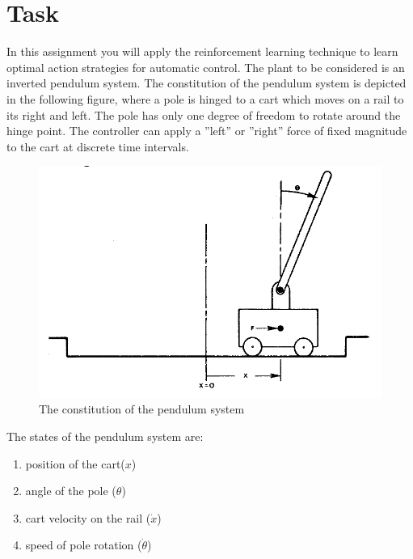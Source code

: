 \documentclass[12pt,a4paper]{article}
\begin{document}
\thispagestyle{empty}

\tableofcontents


\newpage


\setcounter{page}{3}


\section{Task}

In this assignment you will apply the reinforcement learning technique to learn optimal
action strategies for automatic control. The plant to be considered is an inverted pendulum
system. The constitution of the pendulum system is depicted in the following figure, where a
pole is hinged to a cart which moves on a rail to its right and left. The pole has only one
degree of freedom to rotate around the hinge point. The controller can apply a ''left'' or
''right'' force of fixed magnitude to the cart at discrete time intervals. 

\begin{figure}[!ht]
\centering
\includegraphics[width=.6\textwidth]{pendulum-system.jpg}
\caption{The constitution of the pendulum system}
\label{img:pendulum_system}
\end{figure}

\noindent
The states of the pendulum system are:
\begin{enumerate}

	\item position of the cart($x$)
	\item angle of the pole ($\theta$)
	\item cart velocity on the rail ($\dot x$)
	\item speed of pole rotation ($\dot \theta$)

\end{enumerate}
\end{document}

